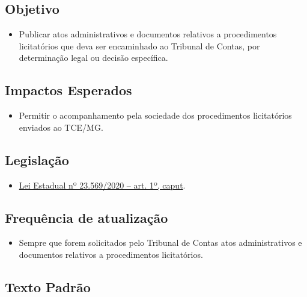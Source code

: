 \documentclass[]{book}
\providecommand{\tightlist}{%
  \setlength{\itemsep}{0pt}\setlength{\parskip}{0pt}}
\begin{document}
\hypertarget{objetivo-10}{%
\subsection{Objetivo}\label{objetivo-10}}

\begin{itemize}
\tightlist
\item
  Publicar atos administrativos e documentos relativos a procedimentos licitatórios que deva ser encaminhado ao Tribunal de Contas, por determinação legal ou decisão específica.
\end{itemize}

\hypertarget{impactos-esperados-11}{%
\subsection{Impactos Esperados}\label{impactos-esperados-11}}

\begin{itemize}
\tightlist
\item
  Permitir o acompanhamento pela sociedade dos procedimentos licitatórios enviados ao TCE/MG.
\end{itemize}

\hypertarget{legislauxe7uxe3o-11}{%
\subsection{Legislação}\label{legislauxe7uxe3o-11}}

\begin{itemize}
\tightlist
\item
  \href{https://www.almg.gov.br/consulte/legislacao/completa/completa.html?tipo=LEI\&num=23569\&comp=\&ano=2020}{Lei Estadual nº 23.569/2020 -- art. 1º, caput}.
\end{itemize}

\hypertarget{frequuxeancia-de-atualizauxe7uxe3o-10}{%
\subsection{Frequência de atualização}\label{frequuxeancia-de-atualizauxe7uxe3o-10}}

\begin{itemize}
\tightlist
\item
  Sempre que forem solicitados pelo Tribunal de Contas atos administrativos e documentos relativos a procedimentos licitatórios.
\end{itemize}

\hypertarget{texto-padruxe3o-11}{%
\subsection{Texto Padrão}\label{texto-padruxe3o-11}}
\end{document}
